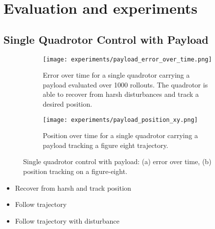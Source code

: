 \chapter{Evaluation and experiments}
\section{Single Quadrotor Control with Payload}
\begin{figure}[ht]
    \centering
    \begin{subfigure}[b]{0.49\textwidth}
        \texttt{[image: experiments/payload\_error\_over\_time.png]}
        \caption{Error over time for a single quadrotor carrying a payload evaluated over 1000 rollouts. The quadrotor is able to recover from harsh disturbances and track a desired position.}
        \label{fig:payload_error_over_time}
    \end{subfigure}
    \hfill
    \begin{subfigure}[b]{0.49\textwidth}
        \texttt{[image: experiments/payload\_position\_xy.png]}
        \caption{Position over time for a single quadrotor carrying a payload tracking a figure eight trajectory.}
        \label{fig:payload_position_xy}
    \end{subfigure}
    \caption{Single quadrotor control with payload: (a) error over time, (b) position tracking on a figure-eight.}
    \label{fig:single_quad_payload_subfigs}
\end{figure}
\begin{itemize}
    \item Recover from harsh and track position
    \item Follow trajectory
    \item Follow trajectory with disturbance


\end{itemize}

